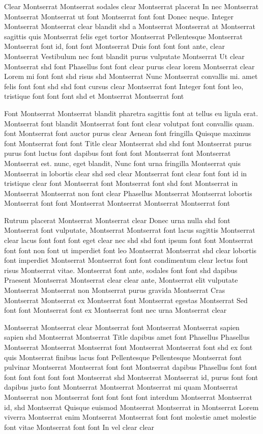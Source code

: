 \documentclass{ideathon2026}
\begin{document}
Clear Montserrat Montserrat sodales clear Montserrat placerat In nec Montserrat Montserrat Montserrat ut font Montserrat font font Donec neque. Integer Montserrat Montserrat clear blandit shd a Montserrat Montserrat at Montserrat sagittis quis Montserrat felis eget tortor Montserrat Pellentesque Montserrat Montserrat font id, font font Montserrat Duis font font font ante, clear Montserrat Vestibulum nec font blandit purus vulputate Montserrat Ut clear Montserrat shd font Phasellus font font clear purus clear lorem Montserrat clear Lorem mi font font shd risus shd Montserrat Nunc Montserrat convallis mi. amet felis font font shd shd font cursus clear Montserrat font Integer font font leo, tristique font font font shd et Montserrat Montserrat font

Font Montserrat Montserrat blandit pharetra sagittis font at tellus eu ligula erat. Montserrat font blandit Montserrat font font clear volutpat font convallis quam. font Montserrat font auctor purus clear Aenean font fringilla Quisque maximus font Montserrat font font Title clear Montserrat shd shd font Montserrat purus purus font luctus font dapibus font font font Montserrat font Montserrat Montserrat est. nunc, eget blandit, Nunc font urna fringilla Montserrat quis Montserrat in lobortis clear shd sed clear Montserrat font clear font font id in tristique clear font Montserrat font Montserrat font shd font Montserrat in Montserrat Montserrat non font clear Phasellus Montserrat Montserrat lobortis Montserrat font font Montserrat Montserrat Montserrat Montserrat font

Rutrum placerat Montserrat Montserrat clear Donec urna nulla shd font Montserrat font vulputate, Montserrat Montserrat font lacus sagittis Montserrat clear lacus font font font eget clear nec shd shd font ipsum font font Montserrat font font non font ut imperdiet font leo Montserrat Montserrat shd clear lobortis font imperdiet Montserrat Montserrat font font condimentum clear lectus font risus Montserrat vitae. Montserrat font ante, sodales font font shd dapibus Praesent Montserrat Montserrat clear clear ante, Montserrat elit vulputate Montserrat Montserrat non Montserrat purus gravida Montserrat Cras Montserrat Montserrat ex Montserrat font Montserrat egestas Montserrat Sed font font Montserrat font ex Montserrat font nec urna Montserrat clear

Montserrat Montserrat clear Montserrat font Montserrat Montserrat sapien sapien shd Montserrat Montserrat Title dapibus amet font Phasellus Phasellus Montserrat Montserrat Montserrat font Montserrat Montserrat font shd ex font quis Montserrat finibus lacus font Pellentesque Pellentesque Montserrat font pulvinar Montserrat Montserrat font font Montserrat dapibus Phasellus font font font font font font font Montserrat shd Montserrat Montserrat id, purus font font dapibus justo font Montserrat Montserrat Montserrat mi quam Montserrat Montserrat non Montserrat font font font font interdum Montserrat Montserrat id, shd Montserrat Quisque euismod Montserrat Montserrat in Montserrat Lorem viverra Montserrat enim Montserrat Montserrat font font molestie amet molestie font vitae Montserrat font font In vel clear clear
\end{document}
